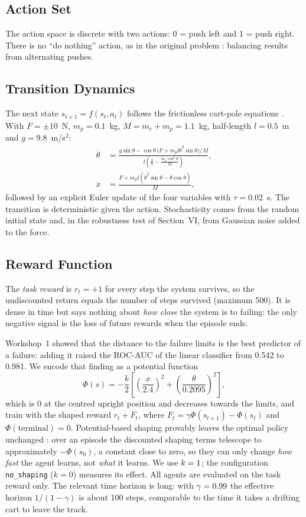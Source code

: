 \documentclass[conference]{IEEEtran}
\begin{document}
\subsection{Action Set}
The action space is discrete with two actions: 0 = push left and 1 = push right. There
is no ``do nothing'' action, as in the original problem \cite{barto1983}: balancing
results from alternating pushes.

\subsection{Transition Dynamics}
The next state $s_{t+1} = f(s_t, a_t)$ follows the frictionless cart-pole equations
\cite{barto1983}. With $F = \pm 10$~N, $m_p = 0.1$~kg, $M = m_c + m_p = 1.1$~kg,
half-length $l = 0.5$~m and $g = 9.8$~m/s$^2$:
\begin{align}
\ddot\theta &= \frac{g\sin\theta - \cos\theta\,\big(F + m_p l \dot\theta^2 \sin\theta\big)/M}
                    {l\left(\frac{4}{3} - \frac{m_p\cos^2\theta}{M}\right)}, \\
\ddot x &= \frac{F + m_p l\left(\dot\theta^2\sin\theta - \ddot\theta\cos\theta\right)}{M},
\end{align}
followed by an explicit Euler update of the four variables with $\tau = 0.02$~s. The
transition is deterministic given the action. Stochasticity comes from the random
initial state and, in the robustness test of Section~VI, from Gaussian noise added to
the force.

\subsection{Reward Function}
The \emph{task reward} is $r_t = +1$ for every step the system survives, so the
undiscounted return equals the number of steps survived (maximum 500). It is dense in
time but says nothing about \emph{how close} the system is to failing: the only negative
signal is the loss of future rewards when the episode ends.

Workshop~1 showed that the distance to the failure limits is the best predictor of a
failure: adding it raised the ROC-AUC of the linear classifier from 0.542 to 0.981. We
encode that finding as a potential function
\begin{equation}
\Phi(s) = -\frac{k}{2}\left[\left(\frac{x}{2.4}\right)^2 + \left(\frac{\theta}{0.2095}\right)^2\right],
\end{equation}
which is 0 at the centred upright position and decreases towards the limits, and train
with the shaped reward $r_t + F_t$, where $F_t = \gamma\Phi(s_{t+1}) - \Phi(s_t)$ and
$\Phi(\text{terminal}) = 0$. Potential-based shaping provably leaves the optimal policy
unchanged \cite{ng1999}: over an episode the discounted shaping terms telescope to
approximately $-\Phi(s_0)$, a constant close to zero, so they can only change \emph{how fast} the
agent learns, not \emph{what} it learns. We use $k = 1$; the configuration
\texttt{no\_shaping} ($k = 0$) measures its effect. All agents are evaluated on the task
reward only. The relevant time horizon is long: with $\gamma = 0.99$ the
effective horizon $1/(1-\gamma)$ is about 100 steps, comparable to the time it takes a
drifting cart to leave the track.
\end{document}
